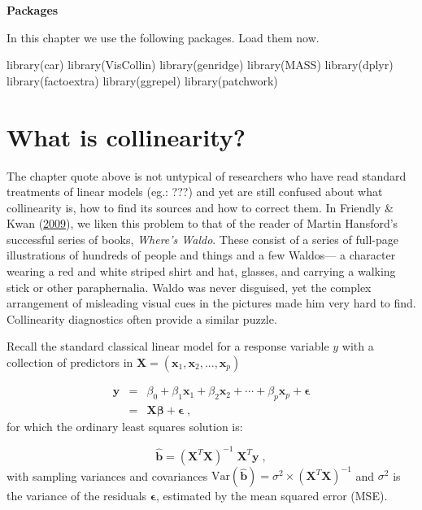 \documentclass[
  letterpaper,
  10pt,
  krantz2]{krantz}
\makeatletter
\newenvironment{Shaded}{\begin{snugshade}}{\end{snugshade}}
\newcommand{\FunctionTok}[1]{\textcolor[rgb]{0.28,0.35,0.67}{#1}}
\newcommand{\NormalTok}[1]{\textcolor[rgb]{0.00,0.23,0.31}{#1}}
\newenvironment{kframe}{%
  \medskip{}
  \setlength{\fboxsep}{.8em}
  \def\at@end@of@kframe{}%
  \ifinner\ifhmode%
  \def\at@end@of@kframe{\end{minipage}}%
  \begin{minipage}{\columnwidth}%
  \fi\fi%
  \def\FrameCommand##1{\hskip\@totalleftmargin \hskip-\fboxsep
  \colorbox{shadecolor}{##1}\hskip-\fboxsep
      \hskip-\linewidth \hskip-\@totalleftmargin \hskip\columnwidth}%
  \MakeFramed {\advance\hsize-\width
    \@totalleftmargin\z@ \linewidth\hsize
    \@setminipage}}%
{\par\unskip\endMakeFramed%
  \at@end@of@kframe}
\renewenvironment{Shaded}{\begin{kframe}}{\end{kframe}}
\makeatother
\begin{document}
\textbf{Packages}

In this chapter we use the following packages. Load them now.

\begin{Shaded}
\begin{Highlighting}[]
\FunctionTok{library}\NormalTok{(car)}
\FunctionTok{library}\NormalTok{(VisCollin)}
\FunctionTok{library}\NormalTok{(genridge)}
\FunctionTok{library}\NormalTok{(MASS)}
\FunctionTok{library}\NormalTok{(dplyr)}
\FunctionTok{library}\NormalTok{(factoextra)}
\FunctionTok{library}\NormalTok{(ggrepel)}
\FunctionTok{library}\NormalTok{(patchwork)}
\end{Highlighting}
\end{Shaded}

\hypertarget{what-is-collinearity}{%
\section{What is collinearity?}\label{what-is-collinearity}}

The chapter quote above is not untypical of researchers who have read
standard treatments of linear models (eg.: ???) and yet are still
confused about what collinearity is, how to find its sources and how to
correct them. In Friendly \& Kwan
(\protect\hyperlink{ref-FriendlyKwan:2009}{2009}), we liken this problem
to that of the reader of Martin Hansford's successful series of books,
\emph{Where's Waldo}. These consist of a series of full-page
illustrations of hundreds of people and things and a few Waldos--- a
character wearing a red and white striped shirt and hat, glasses, and
carrying a walking stick or other paraphernalia. Waldo was never
disguised, yet the complex arrangement of misleading visual cues in the
pictures made him very hard to find. Collinearity diagnostics often
provide a similar puzzle.

Recall the standard classical linear model for a response variable \(y\)
with a collection of predictors in
\(\mathbf{X} = (\mathbf{x}_1, \mathbf{x}_2, ..., \mathbf{x}_p)\)

\begin{eqnarray*}
\mathbf{y} & =&  \beta_0 + \beta_1 \mathbf{x}_1 + \beta_2 \mathbf{x}_2 + \cdots + \beta_p \mathbf{x}_p + \mathbf{\epsilon} \\
         & = & \mathbf{X} \mathbf{\beta} + \mathbf{\epsilon} \; ,
\end{eqnarray*} for which the ordinary least squares solution is:

\[
\widehat{\mathbf{b}} = (\mathbf{X}^T \mathbf{X})^{-1} \; \mathbf{X}^T \mathbf{y} \; ,
\] with sampling variances and covariances
\(\text{Var} (\widehat{\mathbf{b}}) = \sigma^2 \times (\mathbf{X}^T \mathbf{X})^{-1}\)
and \(\sigma^2\) is the variance of the residuals \(\mathbf{\epsilon}\),
estimated by the mean squared error (MSE).
\end{document}
